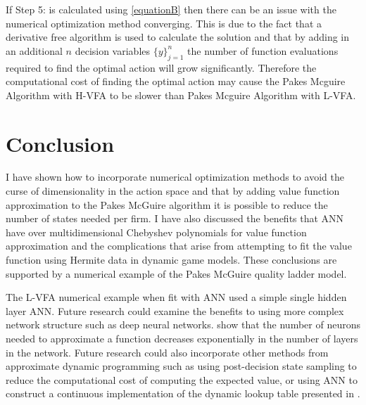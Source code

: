 \documentclass[12pt]{article}
\begin{document}
If Step 5: is calculated using \eqref{equationB} then there can be an issue with the numerical optimization method converging. This is due to the fact that a derivative free algorithm is used to calculate the solution and that by adding in an additional $n$ decision variables $\{y\}_{j=1}^n$ the number of function evaluations required to find the optimal action will grow significantly. Therefore the computational cost of finding the optimal action may cause the Pakes Mcguire Algorithm with H-VFA to be slower than Pakes Mcguire Algorithm with L-VFA.



\section{Conclusion}
\label{con}

I have shown how to incorporate numerical optimization methods to avoid the curse of dimensionality in the action space and that by adding value function approximation to the Pakes McGuire algorithm it is possible to reduce the number of states needed per firm. I have also discussed the benefits that ANN have over multidimensional Chebyshev polynomials for value function approximation and the complications that arise from attempting to fit the value function using Hermite data in dynamic game models. These conclusions are supported by a numerical example of the Pakes McGuire quality ladder model.

The L-VFA numerical example when fit with ANN used a simple single hidden layer ANN. Future research could examine the benefits to using more complex network structure such as deep neural networks. \citet{anndeep} show that the number of neurons needed to approximate a function decreases exponentially in the number of layers in the network. Future research could also incorporate other methods from approximate dynamic programming such as using post-decision state sampling to reduce the computational cost of computing the expected value, or using ANN to construct a continuous implementation of the dynamic lookup table presented in \cite{dlt}.

\end{document}
